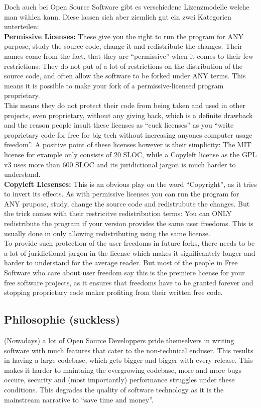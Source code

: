 \documentclass[a4paper,11pt]{article}
\begin{document}
Doch auch bei Open Source Software gibt es verschiedene Lizenzmodelle welche man wählen kann. Diese lassen sich aber ziemlich gut ein zwei Kategorien unterteilen:\\

\textbf{Permissive Licenses:}
These give you the right to run the program for ANY purpose, study the source code, change it and redistribute the changes. Their names come from the fact, that they are ``permissive'' when it comes to their few restrictions: They do not put of a lot of restrictions on the distribution of the source code, and often allow the software to be forked under ANY terms. This means it is possible to make your fork of a permissive-licensed program proprietary.\\

This means they do not protect their code from being taken and used in other projects, even proprietary, without any giving back, which is a definite drawback and the reason people insult these licenses as ``cuck licenses'' as you ``write proprietary code for free for big tech without increasing anyones computer usage freedom''. A positive point of these licenses however is their simplicity: The MIT license for example only consists of 20 SLOC, while a Copyleft license as the GPL v3 uses more than 600 SLOC and its juridictional jargon is much harder to understand.\\

\textbf{Copyleft Licsenses:}
This is an obvious play on the word ``Copyright'', as it tries to invert its effects. As with permissive licenses you can run the program for ANY prupose, study, change the source code and redistrubute the changes. But the trick comes with their restricitve redistribution terms: You can ONLY redistribute the program if your version provides the same user freedoms. This is usually done in only allowing redistributing using the same license.\\

To provide such protection of the user freedoms in future forks, there needs to be a lot of juridictional jargon in the license which makes it significantely longer and harder to understand for the average reader. But most of the people in Free Software who care about user freedom say this is the premiere license for your free software projects, as it ensures that freedoms have to be granted forever and stopping proprietary code maker profiting from their written free code.\\

\subsection{Philosophie (suckless)}
(Nowadays) a lot of Open Source Developpers pride themselvers in writing software with much features that cater to the non-technical enduser. This results in having a large codebase, which gets bigger and bigger with every release. This makes it harder to maintaing the evergrowing codebase, more and more bugs occure, security and (most importantly) performance struggles under these conditions. This degrades the quality of software technology as it is the mainstream narrative to ``save time and money''.\\
\end{document}
